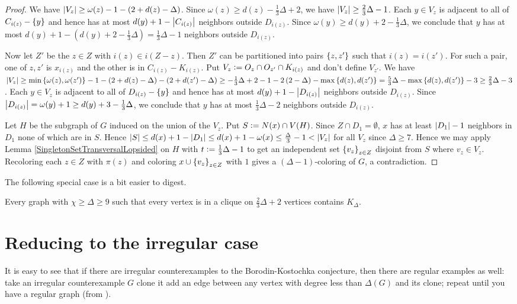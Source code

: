\begin{proof}
We have $\left|V_z\right| \geq \omega(z) - 1 - \left( 2 + d(z) - \Delta \right)$.  Since $\omega(z) \geq d(z) - \frac13 \Delta + 2$, we have $\left|V_z\right| \geq \frac23 \Delta - 1$.   Each $y \in V_z$ is adjacent to all of $C_{i(z)} - \left\{ y \right\}$ and hence has at most $d(y) + 1 - \left|C_{i(z)}\right|$ neighbors outside $D_{i(z)}$.  Since $\omega(y) \geq d(y) +
2 - \frac13 \Delta$, we conclude that $y$ has at most $d(y) + 1
- (d(y) + 2 - \frac13 \Delta) = \frac13 \Delta - 1$ neighbors outside $D_{i(z)}$.

Now let $Z'$ be the $z \in Z$ with $i(z) \in i(Z - z)$. Then $Z'$ can be partitioned into pairs $\left\{ z, z' \right\}$ such that $i(z) = i(z')$.  For such a pair, one of $z,z'$ is $x_{i(z)}$ and the other is in $C_{i(z)} - K_{i(z)}$. Put $V_z \mathrel{\mathop:}= O_z \cap O_{z'} \cap K_{i(z)}$ and don't define $V_{z'}$.  We have $\left|V_z\right| \geq \min\left\{ \omega(z), \omega(z') \right\} - 1 - \left( 2 + d(z) - \Delta \right) - \left( 2 + d(z') - \Delta \right) \geq - \frac13 \Delta + 2 - 1 - 2\left( 2 - \Delta \right) - \max\left\{ d(z), d(z') \right\} = \frac53 \Delta - \max\left\{ d(z), d(z') \right\} - 3 \geq \frac23 \Delta - 3$.  Each $y \in V_z$ is adjacent to all of $D_{i(z)} - \left\{ y \right\}$ and hence has at most $d(y) + 1 - \left|D_{i(z)}\right|$ neighbors outside $D_{i(z)}$.  Since $\left|D_{i(z)}\right| = \omega(y) + 1 \geq d(y) + 3 - \frac13 \Delta$, we conclude that $y$ has at most $\frac13 \Delta - 2$ neighbors outside $D_{i(z)}$.

Let $H$ be the subgraph of $G$ induced on the union of the $V_z$.  Put $S \mathrel{\mathop:}= N(x) \cap V(H)$.  Since $Z \cap D_1 = \emptyset$, $x$ has at least $\left|D_1\right| - 1$ neighbors in $D_1$ none of which are in $S$.  Hence $\left|S\right| \leq d(x) + 1 - \left|D_1\right| \leq d(x) + 1 - \omega(x) \leq \frac{\Delta}{3} - 1 < \left|V_z\right|$ for all $V_z$ since $\Delta \geq 7$. Hence we may apply Lemma
\ref{SingletonSetTransversalLopsided} on $H$ with $t \mathrel{\mathop:}= \frac13\Delta - 1$ to get an independent set $\left\{ v_z \right\}_{z\in Z}$ disjoint from $S$ where $v_z \in V_z$. Recoloring each $z \in Z$ with $\pi(z)$ and
coloring $x \cup \left\{ v_z \right\}_{z \in Z}$ with $1$ gives a $(\Delta - 1)$-coloring
of $G$, a contradiction.
\end{proof}

The following special case is a bit easier to digest.

\begin{cor}\label{TwoThirdsCliqueCor}
Every graph with $\chi \geq \Delta \geq 9$ such that every
vertex is in a clique on $\frac23\Delta + 2$ vertices contains $K_\Delta$.
\end{cor}
\section{Reducing to the irregular case}
It is easy to see that if there are irregular counterexamples to the
Borodin-Kostochka conjecture, then there are regular examples as well: take an
irregular counterexample $G$ clone it add an edge between any vertex with degree
less than $\Delta(G)$ and its clone; repeat until you have a regular graph (from
\cite{molloy2002graph}).

